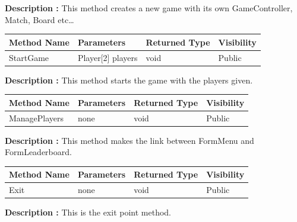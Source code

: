 \documentclass[12pt]{article}
\begin{document}
\textbf{Description :} This method creates a new game with its own GameController, Match, Board etc\dots

\begin{table}[H]
    \begin{tabular}{|l|l|l|l|}
    \hline
    \rowcolor[HTML]{EFEFEF} 
    \cellcolor[HTML]{EFEFEF}\textbf{Method Name} & \textbf{Parameters}    & \textbf{Returned Type} & \textbf{Visibility} \\ \hline
    StartGame                                    & Player[2] players      & void                   & Public              \\ \hline
    \end{tabular}
\end{table}

\textbf{Description :} This method starts the game with the players given.

\begin{table}[H]
    \begin{tabular}{|l|l|l|l|}
    \hline
    \rowcolor[HTML]{EFEFEF} 
    \cellcolor[HTML]{EFEFEF}\textbf{Method Name} & \textbf{Parameters}    & \textbf{Returned Type} & \textbf{Visibility} \\ \hline
    ManagePlayers                                & none                   & void                   & Public              \\ \hline
    \end{tabular}
\end{table}

\textbf{Description :} This method makes the link between FormMenu and FormLeaderboard.

\begin{table}[H]
    \begin{tabular}{|l|l|l|l|}
    \hline
    \rowcolor[HTML]{EFEFEF} 
    \cellcolor[HTML]{EFEFEF}\textbf{Method Name} & \textbf{Parameters}    & \textbf{Returned Type} & \textbf{Visibility} \\ \hline
    Exit                                         & none                   & void                   & Public              \\ \hline
    \end{tabular}
\end{table}

\textbf{Description :} This is the exit point method.

\newpage

\end{document}

